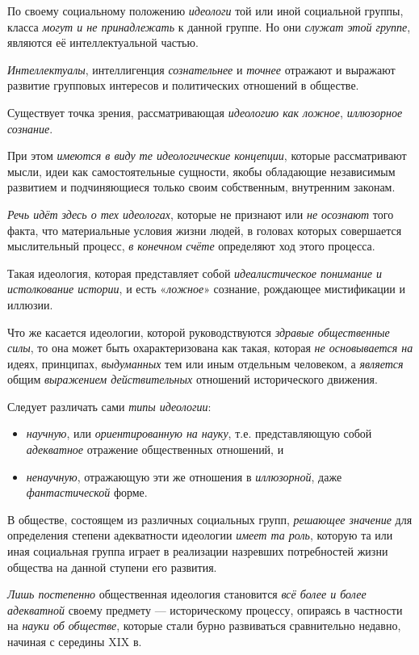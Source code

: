 \documentclass[a4paper,14pt,russian]{extreport}
\begin{document}
По своему социальному положению \emph{идеологи} той или иной социальной группы, класса \emph{могут и не принадлежать} к данной группе. Но они \emph{служат этой группе}, являются её интеллектуальной частью.

\emph{Интеллектуалы}, интеллигенция \emph{сознательнее} и \emph{точнее} отражают и выражают развитие групповых интересов и политических отношений в обществе.

Существует точка зрения, рассматривающая \emph{идеологию как ложное}, \emph{иллюзорное сознание}.

При этом \emph{имеются в виду те идеологические концепции}, которые рассматривают мысли, идеи как самостоятельные сущности, якобы обладающие независимым развитием и подчиняющиеся только своим собственным, внутренним законам.

\emph{Речь идёт здесь о тех идеологах}, которые не признают или \emph{не осознают} того факта, что материальные условия жизни людей, в головах которых совершается мыслительный процесс, \emph{в конечном счёте} определяют ход этого процесса.

Такая идеология, которая представляет собой \emph{идеалистическое понимание и истолкование истории}, и есть «\emph{ложное}» сознание, рождающее мистификации и иллюзии.

Что же касается идеологии, которой руководствуются \emph{здравые общественные силы}, то она может быть охарактеризована как такая, которая \emph{не основывается на} идеях, принципах, \emph{выдуманных} тем или иным отдельным человеком, а \emph{является} общим \emph{выражением действительных} отношений исторического движения.

Следует различать сами \emph{типы идеологии}:

\begin{itemize}
\item \emph{научную}, или \emph{ориентированную на науку}, т.е. представляющую собой \emph{адекватное} отражение общественных отношений, и
\item \emph{ненаучную}, отражающую эти же отношения в \emph{иллюзорной}, даже \emph{фантастической} форме.
\end{itemize}

В обществе, состоящем из различных социальных групп, \emph{решающее значение} для определения степени адекватности идеологии \emph{имеет та роль}, которую та или иная социальная группа играет в реализации назревших потребностей жизни общества на данной ступени его развития.

\emph{Лишь постепенно} общественная идеология становится \emph{всё более и более адекватной} своему предмету --- историческому процессу, опираясь в частности на \emph{науки об обществе}, которые стали бурно развиваться сравнительно недавно, начиная с середины XIX в.
\end{document}
